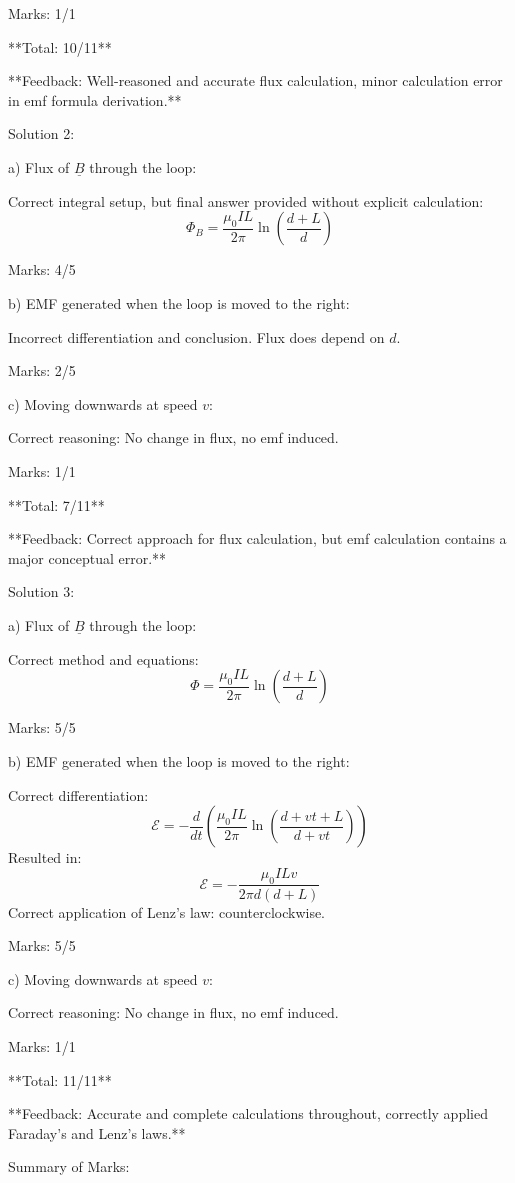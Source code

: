 \documentclass[a4paper,11pt]{article}
\begin{document}
Marks: 1/1

**Total: 10/11**

**Feedback: Well-reasoned and accurate flux calculation, minor calculation error in emf formula derivation.**

Solution 2:

a) Flux of \( \underline{B} \) through the loop:

Correct integral setup, but final answer provided without explicit calculation:
\[
\Phi_B = \frac{\mu_0 I L}{2 \pi} \ln\left(\frac{d+L}{d}\right)
\]

Marks: 4/5

b) EMF generated when the loop is moved to the right:

Incorrect differentiation and conclusion. Flux does depend on \( d \).

Marks: 2/5

c) Moving downwards at speed \( v \):

Correct reasoning: No change in flux, no emf induced.

Marks: 1/1

**Total: 7/11**

**Feedback: Correct approach for flux calculation, but emf calculation contains a major conceptual error.**

Solution 3:

a) Flux of \( \underline{B} \) through the loop:

Correct method and equations:
\[
\Phi = \frac{\mu_0 I L}{2 \pi} \ln\left(\frac{d+L}{d}\right)
\]

Marks: 5/5

b) EMF generated when the loop is moved to the right:

Correct differentiation:
\[
\mathcal{E} = -\frac{d}{dt}\left(\frac{\mu_0 I L}{2 \pi} \ln\left(\frac{d+vt+L}{d+vt}\right)\right)
\]
Resulted in:
\[
\mathcal{E} = -\frac{\mu_0 I L v}{2 \pi d (d+L)}
\]
Correct application of Lenz's law: counterclockwise.

Marks: 5/5

c) Moving downwards at speed \( v \):

Correct reasoning: No change in flux, no emf induced.

Marks: 1/1

**Total: 11/11**

**Feedback: Accurate and complete calculations throughout, correctly applied Faraday's and Lenz's laws.**

Summary of Marks:
\end{document}
